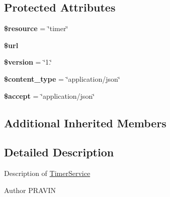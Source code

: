 \subsection*{Protected Attributes}
\begin{DoxyCompactItemize}
\item 
\hypertarget{class_timer_service_abd4c7b8b084214b8d2533ba07fce6b83}{{\bfseries \$resource} = \char`\"{}timer\char`\"{}}\label{class_timer_service_abd4c7b8b084214b8d2533ba07fce6b83}

\item 
\hypertarget{class_timer_service_acf215f34a917d014776ce684a9ee8909}{{\bfseries \$url}}\label{class_timer_service_acf215f34a917d014776ce684a9ee8909}

\item 
\hypertarget{class_timer_service_a17c8948c68aa44fa9961ae169b6a8961}{{\bfseries \$version} = \char`\"{}1.\char`\"{}}\label{class_timer_service_a17c8948c68aa44fa9961ae169b6a8961}

\item 
\hypertarget{class_timer_service_ae754d6373f275e781f47c8bc9b994b6d}{{\bfseries \$content\+\_\+type} = \char`\"{}application/json\char`\"{}}\label{class_timer_service_ae754d6373f275e781f47c8bc9b994b6d}

\item 
\hypertarget{class_timer_service_a75fc18c4ff06288ff9fdf8aba9bd1081}{{\bfseries \$accept} = \char`\"{}application/json\char`\"{}}\label{class_timer_service_a75fc18c4ff06288ff9fdf8aba9bd1081}

\end{DoxyCompactItemize}
\subsection*{Additional Inherited Members}


\subsection{Detailed Description}
Description of \hyperlink{class_timer_service}{Timer\+Service}

\begin{DoxyAuthor}{Author}
P\+R\+A\+V\+I\+N 
\end{DoxyAuthor}


